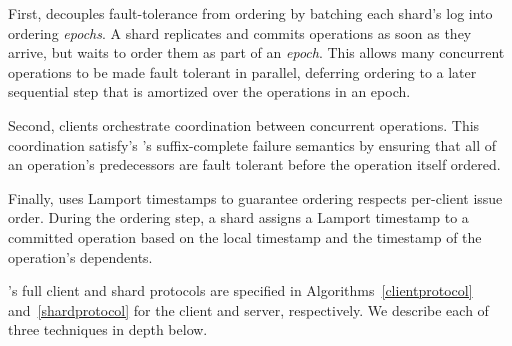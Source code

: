 First, \sys{} decouples fault-tolerance from ordering by batching each shard's
log into ordering \textit{epochs}. A \sys{} shard replicates and commits
operations as soon as they arrive, but waits to order them as part of an
\textit{epoch}. This allows many concurrent operations to be made fault tolerant
in parallel, deferring ordering to a later sequential step that is amortized
over the operations in an epoch.

Second, \sys{} clients orchestrate coordination between concurrent operations.
This coordination satisfy's \MDL{}'s suffix-complete failure semantics by
ensuring that all of an operation's predecessors are fault tolerant before the
operation itself ordered.



Finally, \sys{} uses Lamport timestamps to guarantee ordering respects
per-client issue order. During the ordering step, a shard assigns a
Lamport timestamp to a committed operation based on the local
timestamp and the timestamp of the operation's dependents.

\sys{}'s full client and shard protocols are specified in
Algorithms~\ref{clientprotocol} and~\ref{shardprotocol} for the client and
server, respectively. We describe each of three techniques in depth below.



